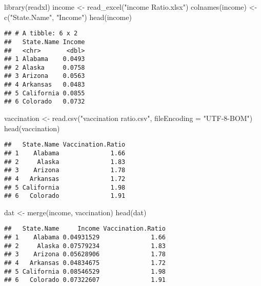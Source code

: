\documentclass[
]{article}
\newenvironment{Shaded}{\begin{snugshade}}{\end{snugshade}}
\newcommand{\AttributeTok}[1]{\textcolor[rgb]{0.77,0.63,0.00}{#1}}
\newcommand{\FunctionTok}[1]{\textcolor[rgb]{0.00,0.00,0.00}{#1}}
\newcommand{\NormalTok}[1]{#1}
\newcommand{\OtherTok}[1]{\textcolor[rgb]{0.56,0.35,0.01}{#1}}
\newcommand{\StringTok}[1]{\textcolor[rgb]{0.31,0.60,0.02}{#1}}
\begin{document}
\begin{Shaded}
\begin{Highlighting}[]
\FunctionTok{library}\NormalTok{(readxl)}
\NormalTok{income }\OtherTok{\textless{}{-}} \FunctionTok{read\_excel}\NormalTok{(}\StringTok{"income Ratio.xlsx"}\NormalTok{)}
\FunctionTok{colnames}\NormalTok{(income) }\OtherTok{\textless{}{-}} \FunctionTok{c}\NormalTok{(}\StringTok{"State.Name"}\NormalTok{, }\StringTok{"Income"}\NormalTok{)}
\FunctionTok{head}\NormalTok{(income)}
\end{Highlighting}
\end{Shaded}

\begin{verbatim}
## # A tibble: 6 x 2
##   State.Name Income
##   <chr>       <dbl>
## 1 Alabama    0.0493
## 2 Alaska     0.0758
## 3 Arizona    0.0563
## 4 Arkansas   0.0483
## 5 California 0.0855
## 6 Colorado   0.0732
\end{verbatim}

\begin{Shaded}
\begin{Highlighting}[]
\NormalTok{vaccination }\OtherTok{\textless{}{-}} \FunctionTok{read.csv}\NormalTok{(}\StringTok{"vaccination ratio.csv"}\NormalTok{, }\AttributeTok{fileEncoding =} \StringTok{"UTF{-}8{-}BOM"}\NormalTok{)}
\FunctionTok{head}\NormalTok{(vaccination)}
\end{Highlighting}
\end{Shaded}

\begin{verbatim}
##   State.Name Vaccination.Ratio
## 1    Alabama              1.66
## 2     Alaska              1.83
## 3    Arizona              1.78
## 4   Arkansas              1.72
## 5 California              1.98
## 6   Colorado              1.91
\end{verbatim}

\begin{Shaded}
\begin{Highlighting}[]
\NormalTok{dat }\OtherTok{\textless{}{-}} \FunctionTok{merge}\NormalTok{(income, vaccination)}
\FunctionTok{head}\NormalTok{(dat)}
\end{Highlighting}
\end{Shaded}

\begin{verbatim}
##   State.Name     Income Vaccination.Ratio
## 1    Alabama 0.04931529              1.66
## 2     Alaska 0.07579234              1.83
## 3    Arizona 0.05628906              1.78
## 4   Arkansas 0.04834675              1.72
## 5 California 0.08546529              1.98
## 6   Colorado 0.07322607              1.91
\end{verbatim}
\end{document}
